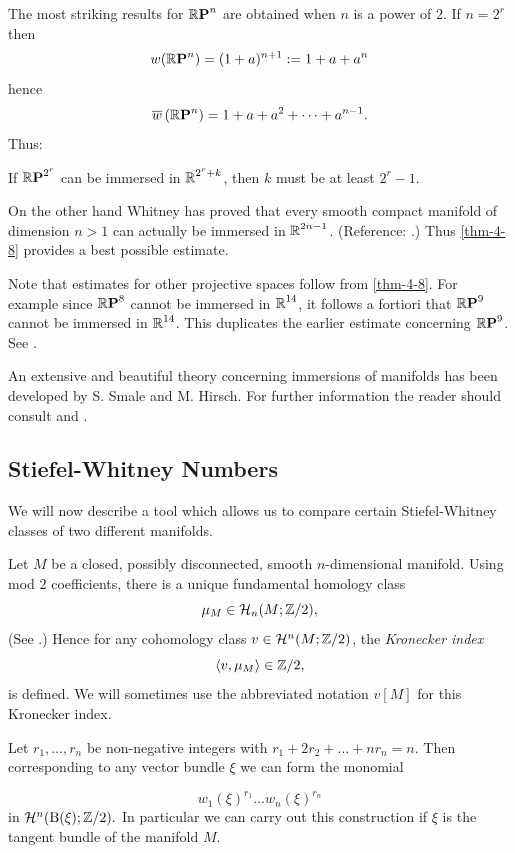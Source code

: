 The most striking results for $\boldsymbol{\mathbb{R}}\boldsymbol{\mathrm{P}}^{n}$ are obtained when $n$ is a power of $2$. If $n=2^{r}$ then
\[
w(\boldsymbol{\mathbb{R}}\boldsymbol{\mathrm{P}}^{n})=(1+a)^{n+1}:=1+a+a^{n}
\]
hence
\[
\overline{w}\left(\boldsymbol{\mathbb{R}}\boldsymbol{\mathrm{P}}^{n}\right)=1+a+a^{2}+\dots+a^{n-1}.
\]
Thus:
\begin{theorem}\label{thm-4-8}
	If $\boldsymbol{\mathbb{R}}\boldsymbol{\mathrm{P}}^{2^{r}}$ can be immersed in $\boldsymbol{\mathbb{R}}^{2^{r}+k}$, then $k$ must be at least $2^{r}-1$.
\end{theorem}

On the other hand Whitney has proved that every smooth compact manifold of dimension $n>1$ can actually be immersed in $\boldsymbol{\mathbb{R}}^{2 n-1}$. (Reference: \cite{61}.) Thus \cref{thm-4-8} provides a best possible estimate.

Note that estimates for other projective spaces follow from \cref{thm-4-8}. For example since $\boldsymbol{\mathbb{R}}\boldsymbol{\mathrm{P}}^{8}$ cannot be immersed in $\boldsymbol{\mathbb{R}}^{14}$, it follows a fortiori that $\boldsymbol{\mathbb{R}}\boldsymbol{\mathrm{P}}^{9}$ cannot be immersed in $\boldsymbol{\mathbb{R}}^{14}$. This duplicates the earlier estimate concerning $\boldsymbol{\mathbb{R}}\boldsymbol{\mathrm{P}}^{9}$. See \cite{62}.

An extensive and beautiful theory concerning immersions of manifolds has been developed by S. Smale and M. Hirsch. For further information the reader should consult \cite{63} and \cite{64}.

\subsection*{Stiefel-Whitney Numbers}

We will now describe a tool which allows us to compare certain Stiefel-Whitney classes of two different manifolds.

Let $M$ be a closed, possibly disconnected, smooth $ n $-dimensional manifold. Using mod $2$ coefficients, there is a unique fundamental homology class
\[
\mu_{M} \in \mathcal{H}_{n}(M ; \mathbb{Z} / 2),
\]
(See .) Hence for any cohomology class $v \in \mathcal{H}^{n}(M ; \mathbb{Z} / 2)$, the \textit{Kronecker index}
\[
\left\langle  v, \mu_{M}\right\rangle \in \mathbb{Z} / 2,
\]
is defined. We will sometimes use the abbreviated notation $v[M]$ for this Kronecker index.

Let $r_{1}, \dots, r_{n}$ be non-negative integers with $r_{1}+2 r_{2}+\dots+n r_{n}=n$. Then corresponding to any vector bundle $\xi$ we can form the monomial

\[
w_{1}(\xi)^{r_{1}} \dots w_{n}(\xi)^{r_{n}}
\]
in $\mathcal{H}^{n}(\mathrm{B}(\xi) ; \mathbb{Z} / 2) .$ In particular we can carry out this construction if $\xi$ is the tangent bundle of the manifold $M$.

